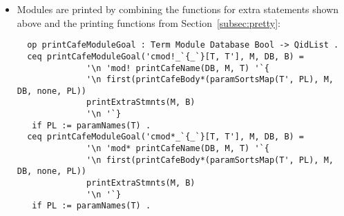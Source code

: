 \begin{itemize}
{\codesize
\begin{verbatim}
  op printAddedRlLemmas : Module RuleSet -> QidList .
  ceq printAddedRlLemmas(M, rl T => T' [AtS] . RS) =
                  ('\n '\t '\s '\s '\g 'trans QILL '\s '\o QIL1
                   '\n '\t '\s '\s '\s '\s '\g '=> '\s '\o QIL2
                   '\s QIL3 '. '\b
                   ' '--> 'Lemma 'added 'by 'the 'prover. '\o
                   printAddedRlLemmas(M, RS))
   if QIL1 := eMetaPrettyPrint(M, T) /\
      QIL2 := eMetaPrettyPrint(M, T') /\
      QIL3 := printCafeAtS(AtS) /\
      QILL := printLabel(AtS) .
\end{verbatim}
}
{\codesize
\begin{comment}
  ceq printAddedRlLemmas(M, crl T => T' if C [AtS] . RS) =
                  ('\n '\t '\s '\s '\g 'ctrans QILL '\s '\o QIL1
                   '\n '\t '\s '\s '\s '\s '\g '=> '\s '\o QIL2
                   '\n '\t '\s '\s '\s '\s '\g 'if '\o '\s QIL3
                   '\s QIL4 '. '\b
                   ' '--> 'Lemma 'added 'by 'the 'prover. '\o
                   printAddedRlLemmas(M, RS))
   if QIL1 := eMetaPrettyPrint(M, T) /\
      QIL2 := eMetaPrettyPrint(M, T') /\
      QIL3 := eMetaPrettyPrint(M, C) /\
      QIL4 := printCafeAtS(AtS) /\
      QILL := printLabel(AtS) .
  eq printAddedRlLemmas(M, none) = nil .
\end{comment}
}

\item
Modules are printed by combining the functions for extra statements shown above
and the printing functions from Section~\ref{subsec:pretty}:

{\codesize
\begin{verbatim}
  op printCafeModuleGoal : Term Module Database Bool -> QidList .
  ceq printCafeModuleGoal('cmod!_`{_`}[T, T'], M, DB, B) =
              '\n 'mod! printCafeName(DB, M, T) '`{
              '\n first(printCafeBody*(paramSortsMap(T', PL), M, DB, none, PL))
              printExtraStmnts(M, B)
              '\n '`}
   if PL := paramNames(T) .
  ceq printCafeModuleGoal('cmod*_`{_`}[T, T'], M, DB, B) =
              '\n 'mod* printCafeName(DB, M, T) '`{
              '\n first(printCafeBody*(paramSortsMap(T', PL), M, DB, none, PL))
              printExtraStmnts(M, B)
              '\n '`}
   if PL := paramNames(T) .
\end{verbatim}
}
{\codesize
\begin{comment}
  op prettyPrintProofTreeAuxCafe : PTreeSet  Database Bool Term -> QidList .
  eq prettyPrintProofTreeAuxCafe(empty, DB, B, T) = nil .
  eq prettyPrintProofTreeAuxCafe(P PS, DB, B, T) =
                          prettyPrintProofTreeCafe(P, DB, B, T)
                          prettyPrintProofTreeAuxCafe(PS, DB, B, T) .
\end{comment}
}


\end{itemize}
